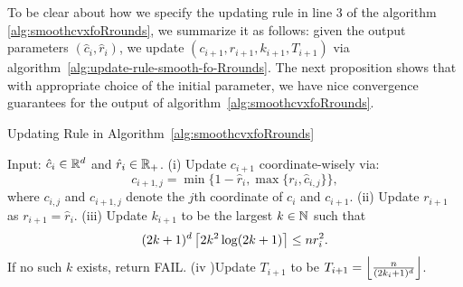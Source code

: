 To be clear about how we specify the updating rule in line 3 of the algorithm 
\ref{alg:smoothcvxfoRrounds}, we summarize it as follows: given the output 
parameters $(\hat{c}_i, \hat{r}_i)$, we update $(c_{i+1}, r_{i+1}, k_{i+1}, T_{i+1})$ via
algorithm~\ref{alg:update-rule-smooth-fo-Rrounds}. The next proposition shows 
that with appropriate choice of the initial parameter, we have nice convergence 
guarantees for the output of algorithm~\ref{alg:smoothcvxfoRrounds}.

\begin{algorithm}[htp]
\caption{Updating Rule in Algorithm~\ref{alg:smoothcvxfoRrounds}}
\begin{algorithmic}
  \Statex Input: $\hat{c}_i \in \mathbb{R}^d$ and $\hat{r}_i \in \mathbb{R}_+$.
  \State (i) Update $c_{i+1}$ coordinate-wisely via: 
  	\begin{equation*}
		c_{i+1, j} = \min\{1-\hat{r}_i, \max\{r_i, \hat{c}_{i, j}\}\},
	\end{equation*}
	where $c_{i, j}$ and $c_{i+1, j}$ denote the $j$th coordinate of 
		$c_i$ and $c_{i+1}$. 
  \State (ii) Update $r_{i+1}$ as $r_{i+1} = \hat{r}_i$.
  \State (iii) Update $k_{i+1}$ to be the largest $k \in \mathbb{N}$ such that 
  	\begin{equation} 
		\label{eqn:existence-of-k-i+1-r-rounds-fo}
		(2k + 1)^d \left\lceil{2k^2 \log (2k+1)}\right\rceil \leq nr_i^2.
	\end{equation}
  	 If no such $k$ exists, return FAIL. 
  \State (iv )Update $T_{i+1}$ to be $T_{i+1} = \left\lfloor{\frac{n}{(2k_i+1)^d}}\right\rfloor$.
\end{algorithmic}
\label{alg:update-rule-smooth-fo-Rrounds}
\end{algorithm}

